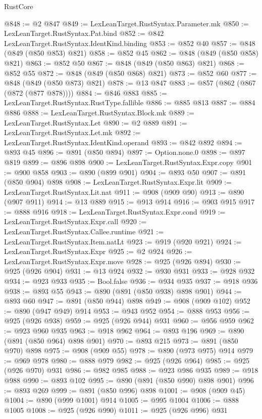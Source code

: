 \begin{lexlean}{RustCore}
\begin{coremodule}
@848 := @2 @847
@849 := LexLeanTarget.RustSyntax.Parameter.mk
@850 := LexLeanTarget.RustSyntax.Pat.bind
@852 := @842 LexLeanTarget.RustSyntax.IdentKind.binding
@853 := @852 @40
@857 := @848 (@849 (@850 @853) @821)
@858 := @852 @45
@862 := @848 (@849 (@850 @858) @821)
@863 := @852 @50
@867 := @848 (@849 (@850 @863) @821)
@868 := @852 @55
@872 := @848 (@849 (@850 @868) @821)
@873 := @852 @60
@877 := @848 (@849 (@850 @873) @821)
@878 := @13 @847
@883 := @857 (@862 (@867 (@872 (@877 @878))))
@884 := @846 @883
@885 := LexLeanTarget.RustSyntax.RustType.fallible
@886 := @885 @813
@887 := @884 @886
@888 := LexLeanTarget.RustSyntax.Block.mk
@889 := LexLeanTarget.RustSyntax.Let
@890 := @2 @889
@891 := LexLeanTarget.RustSyntax.Let.mk
@892 := LexLeanTarget.RustSyntax.IdentKind.operand
@893 := @842 @892
@894 := @893 @45
@896 := @891 (@850 @894)
@897 := Option.none.{0}
@898 := @897 @819
@899 := @896 @898
@900 := LexLeanTarget.RustSyntax.Expr.copy
@901 := @900 @858
@903 := @890 (@899 @901)
@904 := @893 @50
@907 := @891 (@850 @904) @898
@908 := LexLeanTarget.RustSyntax.Expr.lit
@909 := LexLeanTarget.RustSyntax.Lit.nat
@911 := @908 (@909 @90)
@913 := @890 (@907 @911)
@914 := @13 @889
@915 := @913 @914
@916 := @903 @915
@917 := @888 @916
@918 := LexLeanTarget.RustSyntax.Expr.cond
@919 := LexLeanTarget.RustSyntax.Expr.call
@920 := LexLeanTarget.RustSyntax.Callee.runtime
@921 := LexLeanTarget.RustSyntax.Item.natLt
@923 := @919 (@920 @921)
@924 := LexLeanTarget.RustSyntax.Expr
@925 := @2 @924
@926 := LexLeanTarget.RustSyntax.Expr.move
@928 := @925 (@926 @894)
@930 := @925 (@926 @904)
@931 := @13 @924
@932 := @930 @931
@933 := @928 @932
@934 := @923 @933
@935 := Bool.false
@936 := @934 @935
@937 := @918 @936
@938 := @893 @55
@943 := @890 (@891 (@850 @938) @898 @901)
@944 := @893 @60
@947 := @891 (@850 @944) @898
@949 := @908 (@909 @102)
@952 := @890 (@947 @949) @914
@953 := @943 @952
@954 := @888 @953
@956 := @925 (@926 @938)
@959 := @925 (@926 @944) @931
@960 := @956 @959
@962 := @923 @960 @935
@963 := @918 @962
@964 := @893 @196
@969 := @890 (@891 (@850 @964) @898 @901)
@970 := @893 @215
@973 := @891 (@850 @970) @898
@975 := @908 (@909 @55)
@978 := @890 (@973 @975) @914
@979 := @969 @978
@980 := @888 @979
@982 := @925 (@926 @964)
@985 := @925 (@926 @970) @931
@986 := @982 @985
@988 := @923 @986 @935
@989 := @918 @988
@990 := @893 @102
@995 := @890 (@891 (@850 @990) @898 @901)
@996 := @893 @269
@999 := @891 (@850 @996) @898
@1001 := @908 (@909 @45)
@1004 := @890 (@999 @1001) @914
@1005 := @995 @1004
@1006 := @888 @1005
@1008 := @925 (@926 @990)
@1011 := @925 (@926 @996) @931

\end{coremodule}
\end{lexlean}
